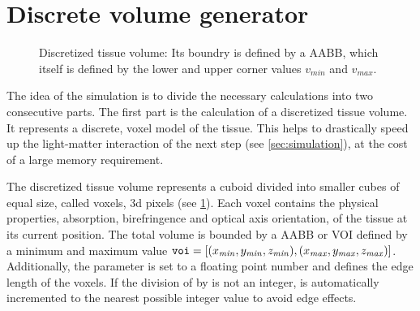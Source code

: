 \section{Discrete volume generator}
\label{sec:dv_generator}
%
\begin{figure}[!t]
\centering
\setlength{\tikzwidth}{0.5\textwidth}

\caption{Discretized tissue volume: Its boundry is defined by a \ac{AABB}, which itself is defined by the lower and upper corner values $v_\mathit{min}$ and $v_\mathit{max}$.}
\label{fig:discVol}
\end{figure}
%
The idea of the simulation is to divide the necessary calculations into two consecutive parts. The first part is the calculation of a discretized tissue volume.
It represents a discrete, voxel model of the tissue.
This helps to drastically speed up the light-matter interaction of the next step (see \cref{sec:simulation}), at the cost of a large memory requirement.
\par
%
The discretized tissue volume represents a cuboid divided into smaller cubes of equal size, called voxels, \ie{} 3d pixels (see \cref{fig:discVol}).
Each voxel contains the physical properties, absorption, birefringence and optical axis orientation, of the tissue at its current position.
The total volume is bounded by a \ac{AABB} or \ac{VOI} defined by a minimum and maximum value $\texttt{voi} = [(x_{\mathit{min}}, y_{\mathit{min}}, z_{\mathit{min}}), (x_{\mathit{max}}, y_{\mathit{max}}, z_{\mathit{max}})]$.
Additionally, the \voxelsize{} parameter \voxelsize{} is set to a floating point number and defines the edge length of the voxels.
If the division of \voi{} by \Voxelsize{} is not an integer, \voi{} is automatically incremented to the nearest possible integer value to avoid edge effects.
%
%
%
